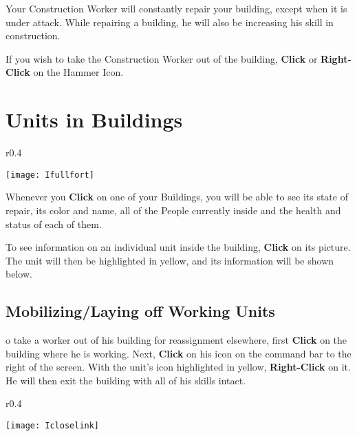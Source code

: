 Your Construction Worker will constantly repair your building, except when it is under attack. While repairing a building, he will also be increasing his skill in construction.

If you wish to take the Construction Worker out of the building, \textbf{Click} or \textbf{Right-Click} on the Hammer Icon.

\clearpage

\section{Units in Buildings}


\begin{wrapfigure}{r}{0.4\textwidth}
	\vspace{-20pt}
	\begin{center}
		\texttt{[image: Ifullfort]} %
	\end{center}
	\vspace{-10pt}
\end{wrapfigure}

Whenever you \textbf{Click} on one of your Buildings, you will be able to see its state of repair, its color and name, all of the People currently inside and the health and status of each of them.

To see information on an individual unit inside the building, \textbf{Click} on its picture. The unit will then be highlighted in yellow, and its information will be shown below.

\subsection{Mobilizing/Laying off Working Units}


o take a worker out of his building for reassignment elsewhere, first \textbf{Click} on the building where he is working. Next, \textbf{Click} on his icon on the command bar to the right of the screen. With the unit’s icon highlighted in yellow, \textbf{Right-Click} on it. He will then exit the building with all of his skills intact.


\begin{wrapfigure}{r}{0.4\textwidth}
	\vspace{-20pt}
	\begin{center}
		\texttt{[image: Icloselink]} %
	\end{center}
	\vspace{-10pt}
\end{wrapfigure}

